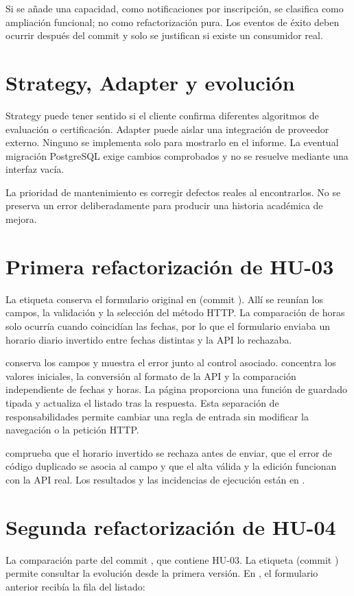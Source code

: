 Si se añade una capacidad, como notificaciones por inscripción, se clasifica como ampliación funcional; no como refactorización pura. Los eventos de éxito deben ocurrir después del commit y solo se justifican si existe un consumidor real.

\section{Strategy, Adapter y evolución}
Strategy puede tener sentido si el cliente confirma diferentes algoritmos de evaluación o certificación. Adapter puede aislar una integración de proveedor externo. Ninguno se implementa solo para mostrarlo en el informe. La eventual migración PostgreSQL exige cambios comprobados y no se resuelve mediante una interfaz vacía.

La prioridad de mantenimiento es corregir defectos reales al encontrarlos. No se preserva un error deliberadamente para producir una historia académica de mejora.

\section{Primera refactorización de HU-03}
La etiqueta  conserva el formulario original en  (commit ). Allí se reunían los campos, la validación y la selección del método HTTP. La comparación de horas solo ocurría cuando coincidían las fechas, por lo que el formulario enviaba un horario diario invertido entre fechas distintas y la API lo rechazaba.

 conserva los campos y muestra el error junto al control asociado.  concentra los valores iniciales, la conversión al formato de la API y la comparación independiente de fechas y horas. La página proporciona una función de guardado tipada y actualiza el listado tras la respuesta. Esta separación de responsabilidades permite cambiar una regla de entrada sin modificar la navegación o la petición HTTP.

 comprueba que el horario invertido se rechaza antes de enviar, que el error de código duplicado se asocia al campo y que el alta válida y la edición funcionan con la API real. Los resultados y las incidencias de ejecución están en .

\section{Segunda refactorización de HU-04}
La comparación parte del commit , que contiene HU-03. La etiqueta
 (commit ) permite consultar la evolución
desde la primera versión. En , el formulario anterior
recibía la fila del listado:

